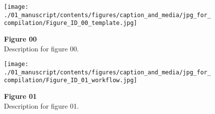 
\begin{figure*}[p]
    \centering
    \texttt{[image: ./01\_manuscript/contents/figures/caption\_and\_media/jpg\_for\_compilation/Figure\_ID\_00\_template.jpg]}
    \caption{
\textbf{
Figure 00
}
\smallskip
\\
Description for figure 00.
}
    \label{fig:00_template}
\end{figure*}

\clearpage
\begin{figure*}[p]
    \centering
    \texttt{[image: ./01\_manuscript/contents/figures/caption\_and\_media/jpg\_for\_compilation/Figure\_ID\_01\_workflow.jpg]}
    \caption{
\textbf{
Figure 01
}
\smallskip
\\
Description for figure 01.
}
    \label{fig:01_workflow}
\end{figure*}

